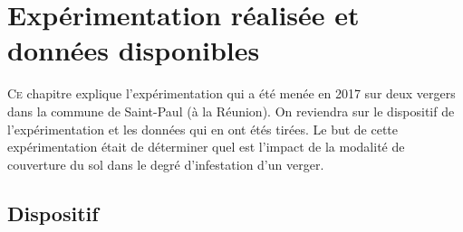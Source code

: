\chapter{Expérimentation réalisée et données disponibles} 

\lettrine{C}{e} chapitre explique l'expérimentation qui a été menée en 2017 sur deux vergers dans la commune de Saint-Paul (à la Réunion). 
On reviendra sur le dispositif de l'expérimentation et les données qui en ont étés tirées.
Le but de cette expérimentation était de déterminer quel est l'impact de la modalité de couverture du sol dans le degré d'infestation d'un verger.


\section{Dispositif}


